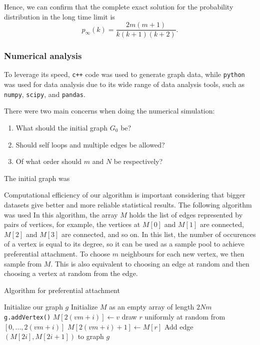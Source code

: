 Hence, we can confirm that the complete exact solution for the probability distribution in the long time limit is 
\begin{equation}
	p_{\infty}(k) = \frac{2m(m+1)}{k(k+1)(k+2)}.
	\label{eq:p-infinity-solution}
\end{equation}

\subsubsection{Numerical analysis}\label{subsection:ppa-numerical-analysis}

To leverage its speed, \texttt{c++} code was used to generate graph data, while \texttt{python} was used for data analysis due to its wide range of data analysis tools, such as \texttt{numpy}, \texttt{scipy}, and \texttt{pandas}. 

There were two main concerns when doing the numerical simulation:

\begin{enumerate}
	\item What should the initial graph $G_0$ be? 
	\item Should self loops and multiple edges be allowed?
	\item Of what order should $m$ and $N$ be respectively?
\end{enumerate}

The initial graph was 

Computational efficiency of our algorithm is important considering that bigger datasets give better and more reliable statistical results. The following algorithm was used In this algorithm, the array $M$ holds the list of edges represented by pairs of vertices, for example, the vertices at $M[0]$ and $M[1]$ are connected, $M[2]$ and $M[3]$ are connected, and so on. In this list, the number of occurences of a vertex is equal to its degree, so it can be used as a sample pool to achieve preferential attachment. To choose $m$ neighbours for each new vertex, we then sample from $M$. This is also equivalent to choosing an edge at random and then choosing a vertex at random from the edge. 

\begin{algorithm}
\caption{Algorithm for preferential attachment}\label{alg:pa}
\begin{algorithmic}[1]
\State Initialize our graph $g$
\State Initialize $M$ as an empty array of length $2Nm$
	\State \texttt{g.addVertex()} 
		\State $M[2(vm + i)] \gets v$
		\State draw $r$ uniformly at random 
		\State from $[0, ..., 2(vm + i)]$
		\State $M[2(vm + i)+1] \gets M[r]$ 
	\EndFor
\EndFor
\State
{}
	\State Add edge $(M[2i], M[2i+1])$ to graph $g$
\EndFor
\end{algorithmic}
\end{algorithm}

